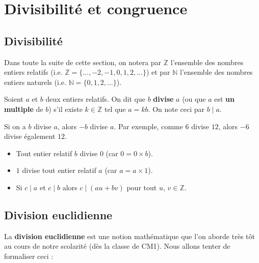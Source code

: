 


	
	\section{Divisibilité et congruence}
	
	\subsection{Divisibilité}
	
	Dans toute la suite de cette section, on notera par $\mathbb{Z}$ l'ensemble des nombres entiers relatifs (i.e. $\mathbb{Z} = \{\dots, -2, -1, 0, 1, 2, \dots\}$) et par $\mathbb{N}$ l'ensemble des nombres entiers naturels (i.e. $\mathbb{N} = \{0, 1, 2, \dots\}$).
	
	\begin{formula}[Définition]
		Soient $a$ et $b$ deux entiers relatifs. On dit que $b$ \textbf{divise} $a$ (ou que $a$ est \textbf{un multiple} de $b$) s'il existe $k \in \mathbb{Z}$ tel que $a = kb$. On note ceci par $b \mid a$.
	\end{formula}
	
	\begin{tip}
		Si on a $b$ divise $a$, alors $-b$ divise $a$. Par exemple, comme $6$ divise $12$, alors $-6$ divise également $12$.
	\end{tip}
	
	\begin{formula}[Propriétés]
		\entretitreetliste
		\begin{itemize}
			\item Tout entier relatif $b$ divise $0$ (car $0 = 0 \times b$).
			\item $1$ divise tout entier relatif $a$ (car $a = a \times 1$).
			\item Si $c \mid a$ et $c \mid b$ alors $c \mid (au + bv)$ pour tout $u$, $v \in \mathbb{Z}$.
		\end{itemize}
	\end{formula}
	
	\subsection{Division euclidienne}
	
	La \textbf{division euclidienne} est une notion mathématique que l'on aborde très tôt au cours de notre scolarité (dès la classe de CM1). Nous allons tenter de formaliser ceci :
	

